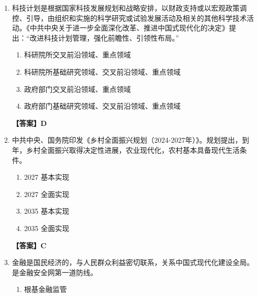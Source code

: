 \documentclass[UTF8,11pt,a4paper]{ctexart}
\begin{document}
\begin{enumerate}[label=\textbf{\arabic*.}, leftmargin=2.5em, itemsep=0.7em]
\begin{enumerate}[label=\Alph*., leftmargin=2em, itemsep=0.1em, topsep=0.15em]
\item 法国巴黎公社
\item 法国里昂工人起义
\item 《共产党宣言》的发表
\item 十月革命
\end{enumerate}
\textbf{【答案】A}
\item 科技计划是根据国家科技发展规划和战略安排，以财政支持或以宏观政策调控、引导，由\allowbreak\underline{\hspace{4em}}组织和实施的科学研究或试验发展活动及相关的其他科学技术活动。《中共中央关于进一步全面深化改革、推进中国式现代化的决定》提出：“改进科技计划管理，强化\allowbreak\underline{\hspace{4em}}前瞻性、引领性布局。”
\begin{enumerate}[label=\Alph*., leftmargin=2em, itemsep=0.1em, topsep=0.15em]
\item 科研院所交叉前沿领域、重点领域
\item 科研院所基础研究领域、交叉前沿领域、重点领域
\item 政府部门交叉前沿领域、重点领域
\item 政府部门基础研究领域、交叉前沿领域、重点领域
\end{enumerate}
\textbf{【答案】D}
\item 中共中央、国务院印发《乡村全面振兴规划（2024-2027年）》。规划提出，到\allowbreak\underline{\hspace{4em}}年，乡村全面振兴取得决定性进展，农业现代化\allowbreak\underline{\hspace{4em}}，农村基本具备现代生活条件。
\begin{enumerate}[label=\Alph*., leftmargin=2em, itemsep=0.1em, topsep=0.15em]
\item 2027 基本实现
\item 2027 全面实现
\item 2035 基本实现
\item 2035 全面实现
\end{enumerate}
\textbf{【答案】C}
\item 金融是国民经济的\allowbreak\underline{\hspace{4em}}，与人民群众利益密切联系，关系中国式现代化建设全局。\allowbreak\underline{\hspace{4em}}是金融安全网第一道防线。
\begin{enumerate}[label=\Alph*., leftmargin=2em, itemsep=0.1em, topsep=0.15em]
\item 根基金融监管

\end{enumerate}
\end{enumerate}
\end{document}

